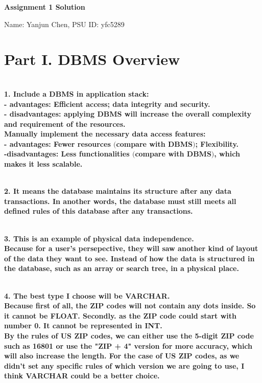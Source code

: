 \documentclass[letterpaper,11pt]{article}
\newcommand{\Paragraph}[1]{~\vspace*{-0.7\baselineskip}\\{\bf #1}}
\begin{document}
\begin{center}
	{\LARGE \bf Assignment 1 Solution}
	
	{\large
	Name: Yanjun Chen, PSU ID: yfc5289}
\end{center}

\section*{Part I. DBMS Overview}

\Paragraph{1.
	Include a DBMS in application stack: \\
	- advantages: Efficient access; data integrity and security. \\
	- disadvantages: applying DBMS will increase the overall complexity and requirement of the resources. \\
	Manually implement the necessary data access features: \\
	- advantages: Fewer resources \((\)compare with DBMS\()\); Flexibility. \\
	-disadvantages: Less functionalities \((\)compare with DBMS\()\), which makes it less scalable. \\
}

\Paragraph{2.
	It means the database maintains its structure after any data transactions. In another words, the database 
	must still meets all defined rules of this database after any transactions.  \\
} 

\Paragraph{3.
	This is an example of physical data independence. \\
	Because for a user's persepective, they will saw another kind of layout of the data they want to see. Instead of 
	how the data is structured in the database, such as an array or search tree, in a physical place. \\
} 

\Paragraph{4. 
	The best type I choose will be VARCHAR. \\
	Because first of all, the ZIP codes will not contain any dots inside. So it cannot be FLOAT. Secondly. as the ZIP code 
	could start with number 0. It cannot be represented in INT. \\
	By the rules of US ZIP codes, we can either use the 5-digit ZIP code such as 16801 or use the "ZIP + 4" 
	version for more accuracy, which will also increase the length. For the case of US ZIP codes, as we didn't set any 
	specific rules of which version we are going to use, I think VARCHAR could be a better choice.\\ 
}
\end{document}
